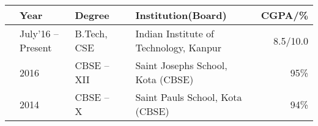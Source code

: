 
\newcommand{\education}[4]{
  & #1 & #2 & &#3 & #4
}


\begin{tabular}{ | L{0.05cm} l | L{3cm} | L{0.05cm} C{8cm} | r |}
  \hline
  \education{\textbf{Year}}{\textbf{Degree}}{\textbf{Institution(Board)}}{\textbf{CGPA/\%}}\\
  \hline
  \education{July'16 -- Present}{B.Tech, CSE}{Indian Institute of Technology, Kanpur}{8.5/10.0}\\
  \education{2016}{CBSE -- XII}{Saint Josephs School, Kota (CBSE)}{95\%}\\
  \education{2014}{CBSE -- X}{Saint Pauls School, Kota (CBSE)}{94\%}\\
  \hline
\end{tabular}

